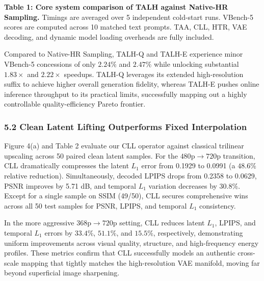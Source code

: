 \textbf{Table 1: Core system comparison of TALH against Native-HR Sampling.} Timings are averaged over 5 independent cold-start runs. VBench-5 scores are computed across 10 matched text prompts. TAA, CLL, HTR, VAE decoding, and dynamic model loading overheads are fully included.

Compared to Native-HR Sampling, TALH-Q and TALH-E experience minor VBench-5 concessions of only \(2.24\%\) and \(2.47\%\) while unlocking substantial \(1.83\times\) and \(2.22\times\) speedups. TALH-Q leverages its extended high-resolution suffix to achieve higher overall generation fidelity, whereas TALH-E pushes online inference throughput to its practical limits, successfully mapping out a highly controllable quality-efficiency Pareto frontier.

\hypertarget{clean-latent-lifting-outperforms-fixed-interpolation}{%
\subsubsection{5.2 Clean Latent Lifting Outperforms Fixed Interpolation}\label{clean-latent-lifting-outperforms-fixed-interpolation}}

Figure 4(a) and Table 2 evaluate our CLL operator against classical trilinear upscaling across 50 paired clean latent samples. For the \(480\text{p} \rightarrow 720\text{p}\) transition, CLL dramatically compresses the latent \(L_1\) error from 0.1929 to 0.0991 (a \(48.6\%\) relative reduction). Simultaneously, decoded LPIPS drops from 0.2358 to 0.0629, PSNR improves by 5.71 dB, and temporal \(L_1\) variation decreases by \(30.8\%\). Except for a single sample on SSIM (49/50), CLL secures comprehensive wins across all 50 test samples for PSNR, LPIPS, and temporal \(L_1\) consistency.

In the more aggressive \(368\text{p} \rightarrow 720\text{p}\) setting, CLL reduces latent \(L_1\), LPIPS, and temporal \(L_1\) errors by \(33.4\%\), \(51.1\%\), and \(15.5\%\), respectively, demonstrating uniform improvements across visual quality, structure, and high-frequency energy profiles. These metrics confirm that CLL successfully models an authentic cross-scale mapping that tightly matches the high-resolution VAE manifold, moving far beyond superficial image sharpening.

